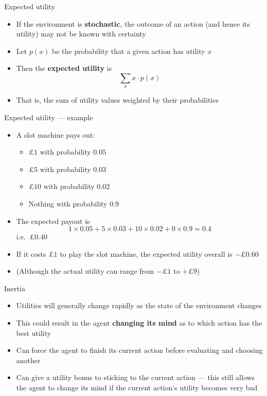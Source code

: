 \begin{frame}{Expected utility}
	\begin{itemize}
        \pause\item If the environment is \textbf{stochastic}, the outcome of an action (and hence its utility)
            may not be known with certainty
		\pause\item Let $p(x)$ be the probability that a given action has utility $x$
		\pause\item Then the \textbf{expected utility} is
            $$ \sum_x x \cdot p(x) $$
        \pause\item That is, the sum of utility values weighted by their probabilities
	\end{itemize}
\end{frame}

\begin{frame}{Expected utility --- example}
	\begin{itemize}
		\pause\item A slot machine pays out:
			\begin{itemize}
				\pause\item $\pounds 1$ with probability $0.05$
				\pause\item $\pounds 5$ with probability $0.03$
				\pause\item $\pounds 10$ with probability $0.02$
				\pause\item Nothing with probability $0.9$
			\end{itemize}
		\pause\item The expected payout is
			$$ 1 \times 0.05 + 5 \times 0.03 + 10 \times 0.02 + 0 \times 0.9
				= 0.4 $$
			i.e.\ $\pounds 0.40$
        \pause\item If it costs $\pounds 1$ to play the slot machine, the expected utility overall is
            $-\pounds 0.60$
        \pause\item (Although the actual utility can range from $-\pounds 1$ to $+\pounds 9$)
	\end{itemize}
\end{frame}

\begin{frame}{Inertia}
    \begin{itemize}
        \pause\item Utilities will generally change rapidly as the state of the environment changes
        \pause\item This could result in the agent \textbf{changing its mind} as to which action has the best utility
        \pause\item Can force the agent to finish its current action before evaluating and choosing another
        \pause\item Can give a utility bonus to sticking to the current action ---
            this still allows the agent to change its mind if the current action's utility becomes very bad
	\end{itemize}
\end{frame}

